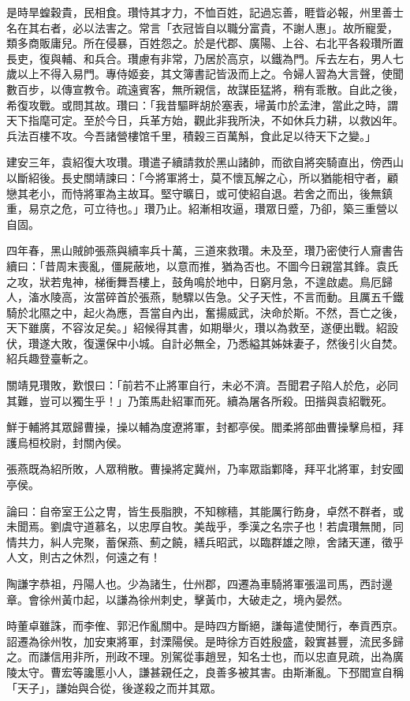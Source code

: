 \begin{pinyinscope}
是時旱蝗穀貴，民相食。瓚恃其才力，不恤百姓，記過忘善，睚眥必報，州里善士名在其右者，必以法害之。常言「衣冠皆自以職分富貴，不謝人惠」。故所寵愛，類多商販庸兒。所在侵暴，百姓怨之。於是代郡、廣陽、上谷、右北平各殺瓚所置長吏，復與輔、和兵合。瓚慮有非常，乃居於高京，以鐵為門。斥去左右，男人七歲以上不得入易門。專侍姬妾，其文簿書記皆汲而上之。令婦人習為大言聲，使聞數百步，以傳宣教令。疏遠賓客，無所親信，故謀臣猛將，稍有乖散。自此之後，希復攻戰。或問其故。瓚曰：「我昔驅畔胡於塞表，埽黃巾於孟津，當此之時，謂天下指麾可定。至於今日，兵革方始，觀此非我所決，不如休兵力耕，以救凶年。兵法百樓不攻。今吾諸營樓馆千里，積穀三百萬斛，食此足以待天下之變。」

建安三年，袁紹復大攻瓚。瓚遣子續請救於黑山諸帥，而欲自將突騎直出，傍西山以斷紹後。長史關靖諫曰：「今將軍將士，莫不懷瓦解之心，所以猶能相守者，顧戀其老小，而恃將軍為主故耳。堅守曠日，或可使紹自退。若舍之而出，後無鎮重，易京之危，可立待也。」瓚乃止。紹漸相攻逼，瓚眾日蹙，乃卻，築三重營以自固。

四年春，黑山賊帥張燕與續率兵十萬，三道來救瓚。未及至，瓚乃密使行人齎書告續曰：「昔周末喪亂，僵屍蔽地，以意而推，猶為否也。不圖今日親當其鋒。袁氏之攻，狀若鬼神，梯衝舞吾樓上，鼓角鳴於地中，日窮月急，不遑啟處。鳥厄歸人，滀水陵高，汝當碎首於張燕，馳驟以告急。父子天性，不言而動。且厲五千鐵騎於北隰之中，起火為應，吾當自內出，奮揚威武，決命於斯。不然，吾亡之後，天下雖廣，不容汝足矣。」紹候得其書，如期舉火，瓚以為救至，遂便出戰。紹設伏，瓚遂大敗，復還保中小城。自計必無全，乃悉縊其姊妹妻子，然後引火自焚。紹兵趣登臺斬之。

關靖見瓚敗，歎恨曰：「前若不止將軍自行，未必不濟。吾聞君子陷人於危，必同其難，豈可以獨生乎！」乃策馬赴紹軍而死。續為屠各所殺。田揩與袁紹戰死。

鮮于輔將其眾歸曹操，操以輔為度遼將軍，封都亭侯。閻柔將部曲曹操擊烏桓，拜護烏桓校尉，封關內侯。

張燕既為紹所敗，人眾稍散。曹操將定冀州，乃率眾詣鄴降，拜平北將軍，封安國亭侯。

論曰：自帝室王公之冑，皆生長脂腴，不知稼穡，其能厲行飭身，卓然不群者，或未聞焉。劉虞守道慕名，以忠厚自牧。美哉乎，季漢之名宗子也！若虞瓚無閒，同情共力，糾人完聚，蓄保燕、薊之饒，繕兵昭武，以臨群雄之隙，舍諸天運，徵乎人文，則古之休烈，何遠之有！

陶謙字恭祖，丹陽人也。少為諸生，仕州郡，四遷為車騎將軍張溫司馬，西討邊章。會徐州黃巾起，以謙為徐州刺史，擊黃巾，大破走之，境內晏然。

時董卓雖誅，而李傕、郭汜作亂關中。是時四方斷絕，謙每遣使閒行，奉貢西京。詔遷為徐州牧，加安東將軍，封溧陽侯。是時徐方百姓殷盛，穀實甚豐，流民多歸之。而謙信用非所，刑政不理。別駕從事趙昱，知名士也，而以忠直見疏，出為廣陵太守。曹宏等讒慝小人，謙甚親任之，良善多被其害。由斯漸亂。下邳閻宣自稱「天子」，謙始與合從，後遂殺之而并其眾。


\end{pinyinscope}
